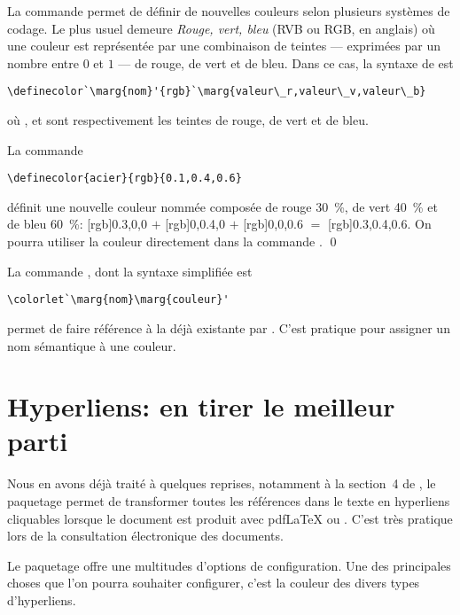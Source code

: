 La commande \cmd{\definecolor} permet de définir de nouvelles couleurs
selon plusieurs systèmes de codage. Le plus usuel demeure \emph{Rouge,
  vert, bleu} (RVB ou RGB, en anglais) où une couleur est représentée
par une combinaison de teintes --- exprimées par un nombre entre $0$
et $1$ --- de rouge, de vert et de bleu. Dans ce cas, la syntaxe de
\cmd{\definecolor} est
\begin{lstlisting}
\definecolor`\marg{nom}'{rgb}`\marg{valeur\_r,valeur\_v,valeur\_b}
\end{lstlisting}
où ,  et  sont
respectivement les teintes de rouge, de vert et de bleu.

\begin{exemple}
  La commande
\begin{lstlisting}
\definecolor{acier}{rgb}{0.1,0.4,0.6}
\end{lstlisting}
  définit une nouvelle couleur nommée  composée de rouge
  30~\%, de vert 40~\% et de bleu 60~\%: %
  [rgb]{0.3,0,0}{\phantom{xx}} $+$ %
  [rgb]{0,0.4,0}{\phantom{xx}} $+$ %
  [rgb]{0,0,0.6}{\phantom{xx}} $=$ %
  [rgb]{0.3,0.4,0.6}{\phantom{xx}}. %
  On pourra utiliser la couleur  directement dans la
  commande \cmdprint{\color}. %
  \qed
\end{exemple}

La commande , dont la syntaxe simplifiée est
\begin{lstlisting}
\colorlet`\marg{nom}\marg{couleur}'
\end{lstlisting}
permet de faire référence à la  déjà existante par
. C'est pratique pour assigner un nom sémantique à une
couleur.



\section{Hyperliens: en tirer le meilleur parti}
\label{sec:trucs:hyperliens}

Nous en avons déjà traité à quelques reprises, notamment à la
section~4 de \citet{UL:latex:1}, le paquetage  permet de
transformer toutes les références dans le texte en hyperliens
cliquables lorsque le document est produit avec pdf{\LaTeX} ou
{\XeLaTeX}. C'est très pratique lors de la consultation électronique
des documents.

Le paquetage offre une multitudes d'options de configuration. Une des
principales choses que l'on pourra souhaiter configurer, c'est la
couleur des divers types d'hyperliens.



